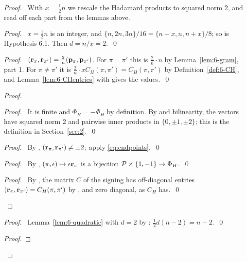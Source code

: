 \begin{proof}
 \pfsketch\ With $x=\frac12n$ we rescale the Hadamard products to squared norm 2, and read off
 each part from the lemmas above.
 \begin{proof}\pf\ $x=\frac12n$ is an integer, and $\{n,2n,3n\}/16=\{n-x,n,n+x\}/8$; so
   is Hypothesis 6.1. Then $d=n/x=2$.~\qed\end{proof}
 \begin{proof}\pf\ $({\mathbf r}_\pi,{\mathbf r}_{\pi'})=\frac2n({\mathbf p}_\pi,{\mathbf p}_{\pi'})$. For $\pi=\pi'$ this is
  $\frac2n\cdot n$ by Lemma~\ref{lem:6-gram}, part 1. For $\pi\neq\pi'$ it is
  $\frac2n\cdot xC_H(\pi,\pi')=C_H(\pi,\pi')$ by Definition~\ref{def:6-CH}, and
  Lemma~\ref{lem:6-CHentries} with  gives the values.~\qed\end{proof}
 \begin{proof}
  \begin{proof}\pf\ It is finite and $\Phi_H=-\Phi_H$ by definition. By  and
   bilinearity, the vectors have squared norm 2 and pairwise inner products in
   $\{0,\pm1,\pm2\}$; this is the definition in Section~\ref{sec:2}.~\qed\end{proof}
  \begin{proof}\pf\ By , $({\mathbf r}_\pi,{\mathbf r}_{\pi'})\neq\pm2$; apply
   \eqref{eq:endpoints}.~\qed\end{proof}
  \begin{proof}\pf\ By , $(\pi,\epsilon)\mapsto\epsilon{\mathbf r}_\pi$ is a
   bijection ${\mathcal P}\times\{1,-1\}\to\Phi_H$.~\qed\end{proof}
  \qedstep
  \begin{proof}\pf\ By , the matrix $C$ of the signing has off-diagonal
   entries $({\mathbf r}_\pi,{\mathbf r}_{\pi'})=C_H(\pi,\pi')$ by , and zero diagonal, as $C_H$
   has.~\qed\end{proof}
 \end{proof}
 \begin{proof}\pf\ Lemma~\ref{lem:6-quadratic} with $d=2$ by :
  $\frac12d(n-2)=n-2$.~\qed\end{proof}
 \begin{proof}

\end{proof}
\end{proof}
